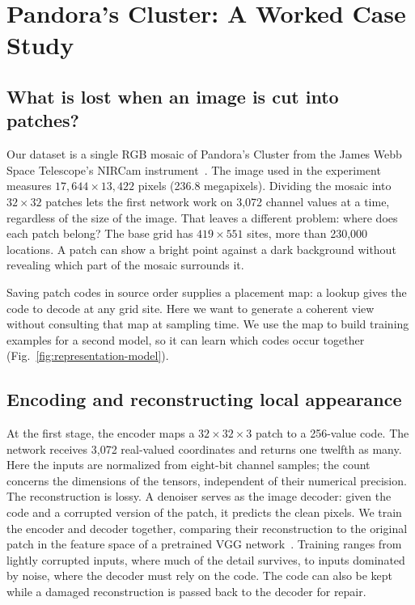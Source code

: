 \section{Pandora's Cluster: A Worked Case Study}
\label{sec:evidence}

\subsection{What is lost when an image is cut into patches?}

Our dataset is a single RGB mosaic of Pandora's Cluster from the James Webb Space Telescope's NIRCam instrument~\cite{webb}. The image used in the experiment measures $17{,}644\times13{,}422$ pixels (236.8 megapixels). Dividing the mosaic into $32\times32$ patches lets the first network work on 3,072 channel values at a time, regardless of the size of the image. That leaves a different problem: where does each patch belong? The base grid has $419\times551$ sites, more than 230,000 locations. A patch can show a bright point against a dark background without revealing which part of the mosaic surrounds it.

Saving patch codes in source order supplies a placement map: a lookup gives the code to decode at any grid site. Here we want to generate a coherent view without consulting that map at sampling time. We use the map to build training examples for a second model, so it can learn which codes occur together (Fig.~\ref{fig:representation-model}).

\subsection{Encoding and reconstructing local appearance}

At the first stage, the encoder maps a $32\times32\times3$ patch to a 256-value code. The network receives 3,072 real-valued coordinates and returns one twelfth as many. Here the inputs are normalized from eight-bit channel samples; the count concerns the dimensions of the tensors, independent of their numerical precision. The reconstruction is lossy. A denoiser serves as the image decoder: given the code and a corrupted version of the patch, it predicts the clean pixels. We train the encoder and decoder together, comparing their reconstruction to the original patch in the feature space of a pretrained VGG network~\cite{vgg,perceptual}. Training ranges from lightly corrupted inputs, where much of the detail survives, to inputs dominated by noise, where the decoder must rely on the code. The code can also be kept while a damaged reconstruction is passed back to the decoder for repair.


